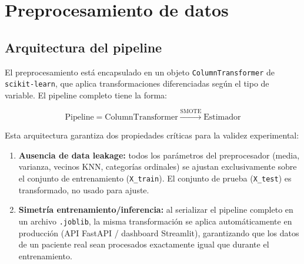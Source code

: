 \documentclass[12pt,a4paper]{article}
\begin{document}
\section{Preprocesamiento de datos}

\subsection{Arquitectura del pipeline}

El preprocesamiento está encapsulado en un objeto \texttt{ColumnTransformer} de \texttt{scikit-learn}, que aplica transformaciones diferenciadas según el tipo de variable. El pipeline completo tiene la forma:

\begin{equation}
  \text{Pipeline} = \text{ColumnTransformer} \xrightarrow{\text{SMOTE}} \text{Estimador}
\end{equation}

Esta arquitectura garantiza dos propiedades críticas para la validez experimental:

\begin{enumerate}[noitemsep]
  \item \textbf{Ausencia de data leakage:} todos los parámetros del preprocesador (media, varianza, vecinos KNN, categorías ordinales) se ajustan exclusivamente sobre el conjunto de entrenamiento (\texttt{X\_train}). El conjunto de prueba (\texttt{X\_test}) es transformado, no usado para ajuste.
  \item \textbf{Simetría entrenamiento/inferencia:} al serializar el pipeline completo en un archivo \texttt{.joblib}, la misma transformación se aplica automáticamente en producción (API FastAPI / dashboard Streamlit), garantizando que los datos de un paciente real sean procesados exactamente igual que durante el entrenamiento.
\end{enumerate}
\end{document}

